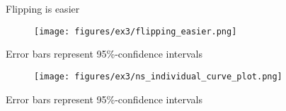 \documentclass{beamer}
\begin{document}
\appendix

\begin{frame}{Flipping is easier}
\begin{figure}
\centering
\texttt{[image: figures/ex3/flipping\_easier.png]}
\end{figure}
{\scriptsize Error bars represent 95\%-confidence intervals}
\end{frame}

\begin{frame}
\begin{figure}
\centering
\texttt{[image: figures/ex3/ns\_individual\_curve\_plot.png]}
\end{figure}
{\scriptsize Error bars represent 95\%-confidence intervals}
\end{frame}
\end{document}

